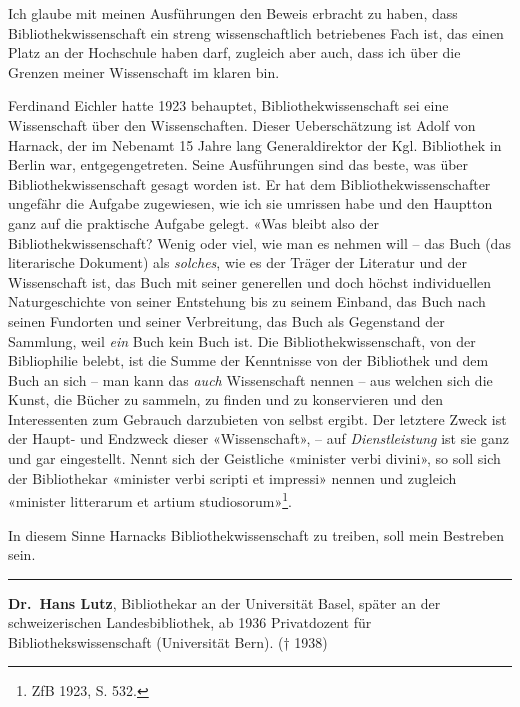 \documentclass[a4paper,
fontsize=11pt,
oneside,
numbers=noperiodatend,
parskip=half-,
bibliography=totoc,
final
]{scrartcl}
\begin{document}
Ich glaube mit meinen Ausführungen den Beweis erbracht zu haben, dass
Bibliothekwissenschaft ein streng wissenschaftlich betriebenes Fach ist,
das einen Platz an der Hochschule haben darf, zugleich aber auch, dass
ich über die Grenzen meiner Wissenschaft im klaren bin.

Ferdinand Eichler hatte 1923 behauptet, Bibliothekwissenschaft sei eine
Wissenschaft über den Wissenschaften. Dieser Ueberschätzung ist Adolf
von Harnack, der im Nebenamt 15 Jahre lang Generaldirektor der Kgl.
Bibliothek in Berlin war, entgegengetreten. Seine Ausführungen sind das
beste, was über Bibliothekwissenschaft gesagt worden ist. Er hat dem
Bibliothekwissenschafter ungefähr die Aufgabe zugewiesen, wie ich sie
umrissen habe und den Hauptton ganz auf die praktische Aufgabe gelegt.
«Was bleibt also der Bibliothekwissenschaft? Wenig oder viel, wie man es
nehmen will -- das Buch (das literarische Dokument) als \emph{solches},
wie es der Träger der Literatur und der Wissenschaft ist, das Buch mit
seiner generellen und doch höchst individuellen Naturgeschichte von
seiner Entstehung bis zu seinem Einband, das Buch nach seinen Fundorten
und seiner Verbreitung, das Buch als Gegenstand der Sammlung, weil
\emph{ein} Buch kein Buch ist. Die Bibliothekwissenschaft, von der
Bibliophilie belebt, ist die Summe der Kenntnisse von der Bibliothek und
dem Buch an sich -- man kann das \emph{auch} Wissenschaft nennen -- aus
welchen sich die Kunst, die Bücher zu sammeln, zu finden und zu
konservieren und den Interessenten zum Gebrauch darzubieten von selbst
ergibt. Der letztere Zweck ist der Haupt- und Endzweck dieser
«Wissenschaft», -- auf \emph{Dienstleistung} ist sie ganz und gar
eingestellt. Nennt sich der Geistliche «minister verbi divini», so soll
sich der Bibliothekar «minister verbi scripti et impressi» nennen und
zugleich «minister litterarum et artium studiosorum»\footnote{ZfB 1923,
  S. 532.}.

In diesem Sinne Harnacks Bibliothekwissenschaft zu treiben, soll mein
Bestreben sein.

\begin{center}\rule{0.5\linewidth}{\linethickness}\end{center}

\textbf{Dr.~Hans Lutz}, Bibliothekar an der Universität Basel, später an der schweizerischen Landesbibliothek, ab 1936 Privatdozent für
Bibliothekswissenschaft (Universität Bern). († 1938)
\end{document}
